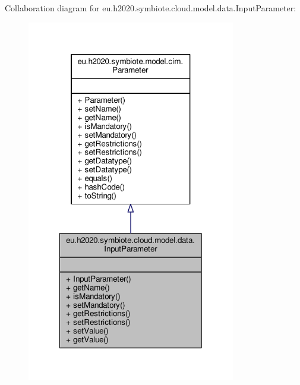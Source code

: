 Collaboration diagram for eu.\+h2020.\+symbiote.\+cloud.\+model.\+data.\+Input\+Parameter\+:
\nopagebreak
\begin{figure}[H]
\begin{center}
\leavevmode
\includegraphics[width=258pt]{classeu_1_1h2020_1_1symbiote_1_1cloud_1_1model_1_1data_1_1InputParameter__coll__graph}
\end{center}
\end{figure}
